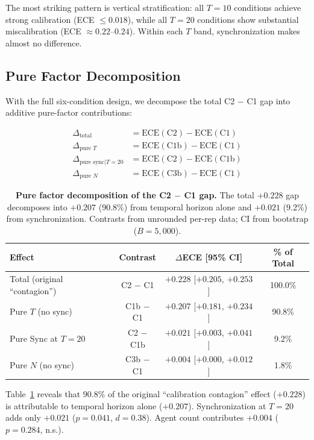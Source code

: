 \documentclass[11pt]{article}
\begin{document}
The most striking pattern is vertical stratification: all $T{=}10$ conditions achieve strong calibration (ECE $\leq 0.018$), while all $T{=}20$ conditions show substantial miscalibration (ECE $\approx 0.22$--$0.24$). Within each $T$ band, synchronization makes almost no difference.

\subsection{Pure Factor Decomposition}

With the full six-condition design, we decompose the total C2 $-$ C1 gap into additive pure-factor contributions:

\begin{align}
\Delta_{\text{total}} &= \text{ECE}(\text{C2}) - \text{ECE}(\text{C1}) \\
\Delta_{\text{pure }T} &= \text{ECE}(\text{C1b}) - \text{ECE}(\text{C1}) \\
\Delta_{\text{pure sync}|T=20} &= \text{ECE}(\text{C2}) - \text{ECE}(\text{C1b}) \\
\Delta_{\text{pure }N} &= \text{ECE}(\text{C3b}) - \text{ECE}(\text{C1})
\end{align}

\begin{table}[t]
\centering
\caption{\textbf{Pure factor decomposition of the C2 $-$ C1 gap.} The total $+0.228$ gap decomposes into $+0.207$ (90.8\%) from temporal horizon alone and $+0.021$ (9.2\%) from synchronization. Contrasts from unrounded per-rep data; CI from bootstrap ($B{=}5{,}000$).}
\label{tab:decomposition}
\begin{tabular}{lccc}
\toprule
Effect & Contrast & $\Delta$ECE [95\% CI] & \% of Total \\
\midrule
Total (original ``contagion'') & C2 $-$ C1  & $+0.228$ [$+0.205$, $+0.253$] & 100.0\% \\
Pure $T$ (no sync)             & C1b $-$ C1 & $+0.207$ [$+0.181$, $+0.234$] & 90.8\%  \\
Pure Sync at $T{=}20$          & C2 $-$ C1b & $+0.021$ [$+0.003$, $+0.041$] & 9.2\%   \\
Pure $N$ (no sync)             & C3b $-$ C1 & $+0.004$ [$+0.000$, $+0.012$] & 1.8\%   \\
\bottomrule
\end{tabular}
\end{table}

Table~\ref{tab:decomposition} reveals that 90.8\% of the original ``calibration contagion'' effect ($+0.228$) is attributable to temporal horizon alone ($+0.207$). Synchronization at $T{=}20$ adds only $+0.021$ ($p = 0.041$, $d = 0.38$). Agent count contributes $+0.004$ ($p = 0.284$, n.s.).
\end{document}
